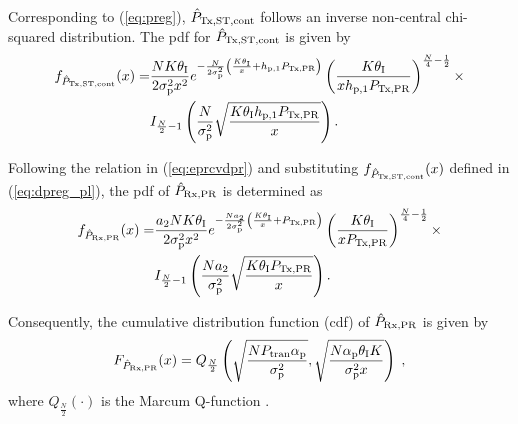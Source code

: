 Corresponding to (\ref{eq:preg}), $\hat{P}_{\text{Tx,ST,cont}}$ follows an inverse non-central chi-squared distribution. The pdf for $\hat{P}_{\text{Tx,ST,cont}}$  is given by
\begin{align}
f_{\hat{P}_{\text{Tx,ST,cont}}}(x) =& \frac{N K \theta_{\text{I}}}{2\sigma^2_{\text{p}} x^2} e^{- \frac{N}{2 \sigma^2_{\text{p}}}\left( \frac{K  \theta_{\text{I}}}{x} + h_{\text{p,1}} P_{\text{Tx,PR}} \right)} \left( \frac{K \theta_{\text{I}}}{x h_{\text{p,1}} P_{\text{Tx,PR}}}   \right)^{\frac{N}{4} - \frac{1}{2}} \label{eq:dpreg_pl} \times \\
\quad & I_{\frac{N}{2}  - 1}\left( \frac{N}{\sigma^2_{\text{p}}} \sqrt{\frac{ K \theta_{\text{I}} h_{\text{p,1}} P_{\text{Tx,PR}}}{x}}  \right). \nonumber
\end{align}

Following the relation in (\ref{eq:eprcvdpr}) and substituting $f_{\hat{P}_{\text{Tx,ST,cont}}}(x)$ defined in (\ref{eq:dpreg_pl}), the pdf of $\hat{P}_{\text{Rx,PR}}$ is determined as 
\begin{align}
f_{\hat{P}_{\text{Rx,PR}}}(x) =& \frac{a_{\text{2}} N K \theta_{\text{I}}}{2\sigma^2_{\text{p}} x^2} e^{- \frac{N a_{\text{2}}}{2 \sigma^2_{\text{p}}}\left( \frac{K  \theta_{\text{I}}}{x} + P_{\text{Tx,PR}} \right)} \left( \frac{K \theta_{\text{I}}}{x P_{\text{Tx,PR}}}   \right)^{\frac{N}{4} - \frac{1}{2}} \times \label{eq:dpp_pl} \\
\quad & I_{\frac{N}{2}  - 1}\left( \frac{N a_{\text{2}}}{\sigma^2_{\text{p}}} \sqrt{\frac{ K \theta_{\text{I}} P_{\text{Tx,PR}}}{x}}  \right). \nonumber
\end{align}

Consequently, the cumulative distribution function (cdf) of $\hat{P}_{\text{Rx,PR}}$ is given by %
\begin{equation}
	\label{eq:cdf}
	F_{\hat{P}_{\text{Rx,PR}}}(x) = Q_{\frac{N}{2}}\left(\sqrt{\frac{N P_\textrm{tran} \alpha_\textrm{p}}{\sigma_\textrm{p}^2}},\sqrt{\frac{N \alpha_\textrm{p} \theta_\textrm{I} K}{\sigma_\textrm{p}^2 x}}\right) \;  ,
\end{equation}
where $Q_{\frac{N}{2}}(\cdot)$ is the Marcum Q-function \cite{Jef00}.

